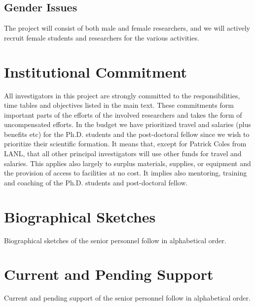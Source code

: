 \documentclass[10pt]{article}
\begin{document}
\subsection{Gender Issues}


The project will consist of both male and female researchers, and we
will actively recruit female students and researchers for the various activities. 


\section{Institutional Commitment}

 
All investigators in this project are strongly committed to the responsibilities, time tables and objectives listed in the main text. These commitments form important parts of the efforts of the involved researchers and takes the form of uncompensated efforts. In the budget we have prioritized travel and salaries (plus benefits etc) for the Ph.D. students and the post-doctoral fellow since we wish to prioritize their scientific formation. It means that, except for Patrick Coles from LANL, that all other principal investigators will use other funds for travel and salaries. 
This applies also largely to surplus materials, supplies, or equipment and  the provision of access to facilities at no cost. It implies also mentoring, training and coaching of the Ph.D. students and post-doctoral fellow. 
\clearpage
\appendix

\section{Biographical Sketches}

Biographical sketches of the senior personnel follow in alphabetical order.

\clearpage

\clearpage

\clearpage

\clearpage
%
\clearpage

\clearpage

\clearpage

\clearpage

\clearpage
\section{Current and Pending Support}

Current and pending support of the senior personnel follow in alphabetical order.

\clearpage

\clearpage
\end{document}
